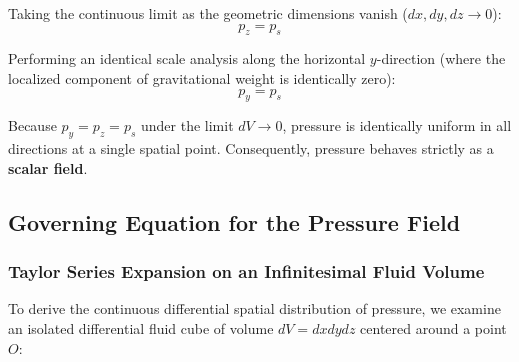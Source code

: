 Taking the continuous limit as the geometric dimensions vanish ($dx, dy, dz \to 0$):
\begin{equation}
    p_z = p_s
\end{equation}

Performing an identical scale analysis along the horizontal $y$-direction (where the localized component of gravitational weight is identically zero):
\begin{equation}
    p_y = p_s
\end{equation}

\begin{conceptbox}
Because $p_y = p_z = p_s$ under the limit $dV \to 0$, pressure is identically uniform in all directions at a single spatial point. Consequently, pressure behaves strictly as a \textbf{scalar field}.
\end{conceptbox}

\subsection{Governing Equation for the Pressure Field}

\subsubsection{Taylor Series Expansion on an Infinitesimal Fluid Volume}

To derive the continuous differential spatial distribution of pressure, we examine an isolated differential fluid cube of volume $dV = dx dy dz$ centered around a point $O$:

